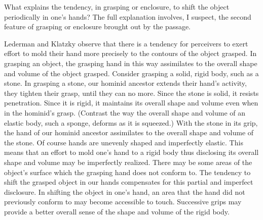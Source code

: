 \documentclass[12pt]{article}
\begin{document}
What explains the tendency, in grasping or enclosure, to shift the object periodically in one's hands? The full explanation involves, I suspect, the second feature of grasping or enclosure brought out by the passage. 

Lederman and Klatzky observe that there is a tendency for perceivers to exert effort to mold their hand more precisely to the contours of the object grasped. In grasping an object, the grasping hand in this way assimilates to the overall shape and volume of the object grasped. Consider grasping a solid, rigid body, such as a stone. In grasping a stone, our hominid ancestor extends their hand's activity, they tighten their grasp, until they can no more. Since the stone is solid, it resists penetration. Since it is rigid, it maintains its overall shape and volume even when in the hominid's grasp. (Contrast the way the overall shape and volume of an elastic body, such a sponge, deforms as it is squeezed.) With the stone in its grip, the hand of our hominid ancestor assimilates to the overall shape and volume of the stone. Of course hands are unevenly shaped and imperfectly elastic. This means that an effort to mold one's hand to a rigid body thus disclosing its overall shape and volume may be imperfectly realized. There may be some areas of the object's surface which the grasping hand does not conform to. The tendency to shift the grasped object in our hands compensates for this partial and imperfect disclosure. In shifting the object in one's hand, an area that the hand did not previously conform to may become accessible to touch. Successive grips may provide a better overall sense of the shape and volume of the rigid body. 
\end{document}
